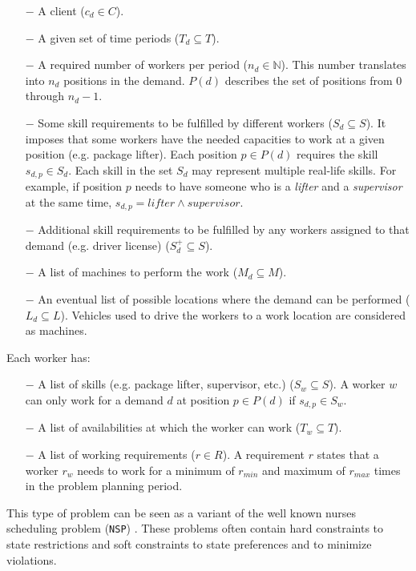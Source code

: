 \documentclass[../thesis.tex]{subfiles}
\begin{document}
\begin{itemize}
  \item[$-$] A client ($c_d \in C$).
  \item[$-$] A given set of time periods ($T_d \subseteq T$).
  \item[$-$] A required number of workers per period ($n_d \in \mathbb{N}$).
      This number translates into $n_d$ positions in the demand. 
      $P(d)$ describes the set of positions from $0$ through $n_d - 1$. 
  \item[$-$] Some skill requirements to be fulfilled by different workers ($S_d \subseteq S$).
  It imposes that some workers have the needed capacities to work at a given position (e.g. package lifter).
  Each position $p \in P(d)$ requires the skill $s_{d,p} \in S_d$. Each skill in the set $S_d$ may represent
  multiple real-life skills. For example, if position $p$ needs to have someone who is a \emph{lifter} and a \emph{supervisor} at the same 
  time, $s_{d,p} = lifter \land supervisor$.
  \item[$-$] Additional skill requirements to be fulfilled by any workers assigned to that demand (e.g. driver license) ($S^{+}_d \subseteq S$).
  \item[$-$] A list of machines to perform the work ($M_d \subseteq M$).
  \item[$-$] An eventual list of possible locations where the demand can be performed ($L_d \subseteq L$).
  Vehicles used to drive the workers to a work location are considered as machines.
\end{itemize}


Each worker has:

\begin{itemize}
  \item[$-$] A list of skills (e.g. package lifter, supervisor, etc.) ($S_w \subseteq S$).
             A worker $w$ can only work for a demand $d$ at position $p \in P(d)$ if $s_{d,p} \in S_w$. 
  \item[$-$] A list of availabilities at which the worker can work ($T_w \subseteq T$).  
  \item[$-$] A list of working requirements ($r \in R$). A requirement $r$ states that a worker $r_w$
  needs to work for a minimum of $r_{min}$ and maximum of $r_{max}$ times in the problem planning period.  
\end{itemize}


This type of problem can be seen as a variant of the 
well known nurses scheduling problem (\texttt{NSP}) \cite{Burke2004}. 
These problems often contain hard constraints to state restrictions 
and soft constraints to state preferences and to minimize violations.
\end{document}
